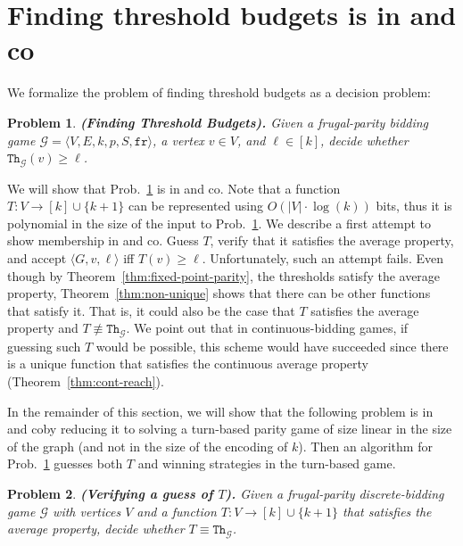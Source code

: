 \documentclass{article}\providecommand{\nequiv}{\not\equiv}\usepackage[a4paper,margin=20mm]{geometry}
\newcommand{\G}{{\mathcal G}}
\newcommand{\fr}{\texttt{fr}}
\newcommand{\thresh}{\texttt{Th}\xspace}
\newcommand{\zug}[1]{\langle #1  \rangle}
\newtheorem{problem}{Problem}
\begin{document}
\section{Finding threshold budgets is in \NP and co\NP}
\label{sec:NP and coNP}

We formalize the problem of finding threshold budgets as a decision problem: 
\begin{problem}
\label{prob:decision-threshold}
{\bf (Finding Threshold Budgets).}
Given a frugal-parity bidding game $\G = \zug{V, E, k, p, S, \fr}$, a vertex $v \in V$, and $\ell \in [k]$, decide whether $\thresh_\G(v) \geq \ell$.
\end{problem}

We will show that Prob.~\ref{prob:decision-threshold} is in \NP and co\NP. 
Note that a function \(T : V \rightarrow [k] \cup \{k+1\}\) can be represented using $O(|V| \cdot \log(k))$ bits, thus it is polynomial in the size of the input to Prob.~\ref{prob:decision-threshold}. 
We describe a first attempt to show membership in \NP and co\NP. Guess $T$, verify that it satisfies the average property, and accept $\zug{G, v, \ell}$ iff $T(v) \geq \ell$. 
Unfortunately, such an attempt fails. Even though by Theorem~\ref{thm:fixed-point-parity}, the thresholds satisfy the average property, Theorem~\ref{thm:non-unique} shows that there can be other functions that satisfy it. That is, it could also be the case that $T$ satisfies the average property and $T \not \equiv \thresh_\G$. 
We point out that in continuous-bidding games, if guessing such $T$ would be possible, this scheme would have succeeded since there is a unique function that satisfies the continuous average property (Theorem~\ref{thm:cont-reach}). 

In the remainder of this section, we will show that the following problem is in \NP and co\NP by reducing it to solving a turn-based parity game of size linear in the size of the graph (and not in the size of the encoding of \(k\)). 
Then an algorithm for Prob.~\ref{prob:decision-threshold} guesses both \(T\) and winning strategies in the turn-based game. 

\begin{problem}
\label{prob:thresh-equiv}
{\bf (Verifying a guess of $T$).} Given a frugal-parity discrete-bidding game $\G$ with vertices $V$ and a function \(T : V \rightarrow [k] \cup \{k+1\}\) that satisfies the average property, decide whether \(T \equiv \thresh_\G\).
\end{problem}
\end{document}
